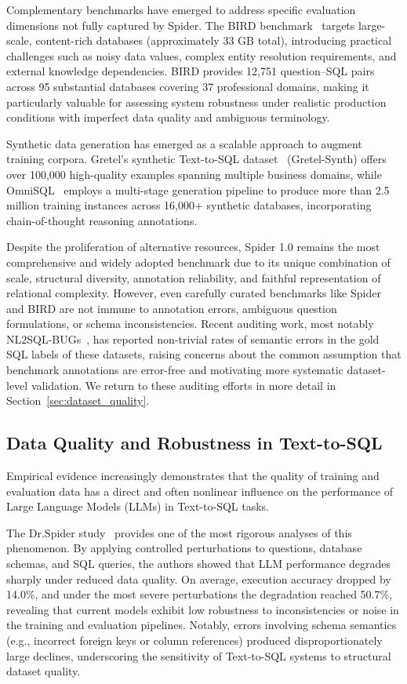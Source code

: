 \documentclass[print]{einformatica}
\begin{document}
Complementary benchmarks have emerged to address specific evaluation dimensions not fully captured by Spider. The BIRD benchmark~\cite{li2023bird} targets large-scale, content-rich databases (approximately 33 GB total), introducing practical challenges such as noisy data values, complex entity resolution requirements, and external knowledge dependencies. BIRD provides 12,751 question--SQL pairs across 95 substantial databases covering 37 professional domains, making it particularly valuable for assessing system robustness under realistic production conditions with imperfect data quality and ambiguous terminology.

Synthetic data generation has emerged as a scalable approach to augment training corpora. Gretel's synthetic Text-to-SQL dataset~\cite{gretelSynthDataset} (Gretel-Synth) offers over 100,000 high-quality examples spanning multiple business domains, while OmniSQL~\cite{li2025omnisql} employs a multi-stage generation pipeline to produce more than 2.5 million training instances across 16,000+ synthetic databases, incorporating chain-of-thought reasoning annotations. 

Despite the proliferation of alternative resources, Spider 1.0 remains the most comprehensive and widely adopted benchmark due to its unique combination of scale, structural diversity, annotation reliability, and faithful representation of relational complexity. However, even carefully curated benchmarks like Spider and BIRD are not immune to annotation errors, ambiguous question formulations, or schema inconsistencies. Recent auditing work, most notably NL2SQL-BUGs~\cite{liu2025nl2sqlbugs}, has reported non-trivial rates of semantic errors in the gold SQL labels of these datasets, raising concerns about the common assumption that benchmark annotations are error-free and motivating more systematic dataset-level validation. We return to these auditing efforts in more detail in Section~\ref{sec:dataset_quality}.

\subsection{Data Quality and Robustness in Text-to-SQL}\label{sec:data_quality_robustness}

Empirical evidence increasingly demonstrates that the quality of training and evaluation data has a direct and often nonlinear influence on the performance of Large Language Models (LLMs) in Text-to-SQL tasks. 

The Dr.Spider study~\cite{chang2023drspider} provides one of the most rigorous analyses of this phenomenon. By applying controlled perturbations to questions, database schemas, and SQL queries, the authors showed that LLM performance degrades sharply under reduced data quality. On average, execution accuracy dropped by 14.0\%, and under the most severe perturbations the degradation reached 50.7\%, revealing that current models exhibit low robustness to inconsistencies or noise in the training and evaluation pipelines. Notably, errors involving schema semantics (e.g., incorrect foreign keys or column references) produced disproportionately large declines, underscoring the sensitivity of Text-to-SQL systems to structural dataset quality.
\end{document}
